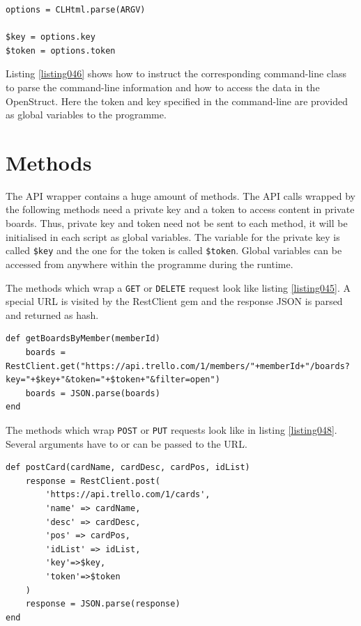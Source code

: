 \begin{lstlisting}[aboveskip=1\baselineskip, caption=Reading the OpenStruct\index{OpenStruct} containing the command-line information., label=listing046]
options = CLHtml.parse(ARGV)

$key = options.key
$token = options.token
\end{lstlisting}

Listing \ref{listing046} shows how to instruct the corresponding command-line class to parse the command-line information and how to access the data in the OpenStruct. Here the token and key specified in the command-line are provided as global variables to the programme.

\section{Methods}
The API wrapper contains a huge amount of methods. The API calls wrapped by the following methods need a private key and a token to access content in private boards. Thus, private key and token need not be sent to each method, it will be initialised in each script as global variables. The variable for the private key is called \lstinline{$key} and the one for the token is called \lstinline{$token}. Global variables can be accessed from anywhere within the programme during the runtime.

The methods which wrap a \texttt{GET} or \texttt{DELETE} request look like listing \ref{listing045}. A special URL is visited by the RestClient gem and the response JSON is parsed and returned as hash. 

\begin{lstlisting}[aboveskip=1\baselineskip, caption=\lstinline{getBoardsByMember()}, label=listing045]
def getBoardsByMember(memberId)
	boards = RestClient.get("https://api.trello.com/1/members/"+memberId+"/boards?key="+$key+"&token="+$token+"&filter=open")
	boards = JSON.parse(boards)
end
\end{lstlisting}

The methods which wrap \texttt{POST} or \texttt{PUT} requests look like in listing \ref{listing048}. Several arguments have to or can be passed to the URL. 

\vskip 12cm

\begin{lstlisting}[aboveskip=1\baselineskip, caption=\lstinline{postCard()}, label=listing048]
def postCard(cardName, cardDesc, cardPos, idList)
	response = RestClient.post(
		'https://api.trello.com/1/cards',
		'name' => cardName,
		'desc' => cardDesc,
		'pos' => cardPos,
		'idList' => idList,
		'key'=>$key,
		'token'=>$token
	)
	response = JSON.parse(response)
end
\end{lstlisting}

